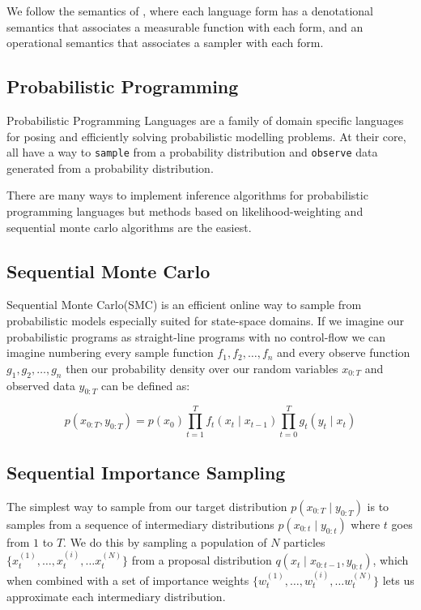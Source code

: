 \documentclass[
]{ceurart}
\begin{document}
We follow the semantics of \cite{staton2016semantics}, where each
language form has a denotational semantics that associates a
measurable function with each form, and an operational semantics that associates
a sampler with each form.

\subsection{Probabilistic Programming}

Probabilistic Programming Languages\cite{wood2014new,
  van2018introduction} are a family of domain specific languages for
posing and efficiently solving probabilistic modelling problems. At
their core, all have a way to \texttt{sample} from a probability
distribution and \texttt{observe} data generated from a probability
distribution.

There are many ways to implement inference algorithms for probabilistic
programming languages but methods based on likelihood-weighting and
sequential monte carlo algorithms are the easiest.

\subsection{Sequential Monte Carlo}

Sequential Monte Carlo\cite{chopin2020introduction}(SMC) is an efficient
online way to sample from probabilistic models especially suited for
state-space domains. If we imagine our probabilistic programs as
straight-line programs with no control-flow we can imagine numbering
every sample function $f_1, f_2, \ldots, f_n$ and every observe
function $g_1, g_2, \ldots, g_n$ then our probability density over our
random variables $x_{0:T}$ and observed data $y_{0:T}$ can be defined as:

\begin{equation}
  p(x_{0:T}, y_{0:T}) = p(x_0)\prod_{t=1}^T f_t(x_t \mid x_{t-1})\prod_{t=0}^T g_t(y_t \mid x_t)
\end{equation}

\subsection{Sequential Importance Sampling}

The simplest way to sample from our target distribution $p(x_{0:T}
\mid y_{0:T})$ is to samples from a sequence of intermediary
distributions $p(x_{0:t} \mid y_{0:t})$ where $t$ goes from $1$ to
$T$. We do this by sampling a population of $N$ particles
$\{x^{(1)}_t, \ldots, x^{(i)}_t, \ldots x^{(N)}_t\}$ from a proposal
distribution $q(x_t \mid x_{0:t-1}, y_{0:t})$, which when combined
with a set of importance weights $\{w^{(1)}_t, \ldots, w^{(i)}_t,
\ldots w^{(N)}_t\}$ lets us approximate each intermediary
distribution.
\end{document}
